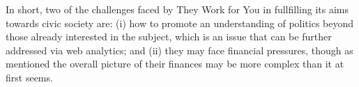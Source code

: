 \color{blue}
  In short, two of the challenges faced by They Work for You in fullfilling its aims towards civic society are: (i) how to promote an understanding of politics beyond those already interested in the subject, which is an issue that can be further addressed via web analytics; and (ii) they may face financial pressures, though as mentioned the overall picture of their finances may be more complex than it at first seems.
\color{darkgray}  